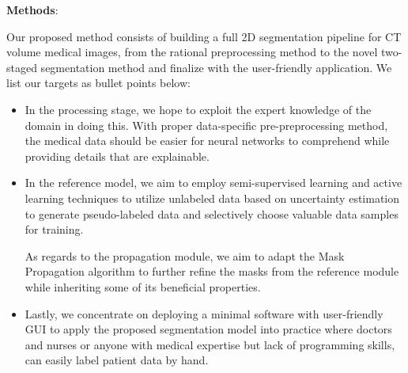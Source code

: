 \documentclass[12pt]{article}
\begin{document}
\textbf{Methods}: \par Our proposed method consists of building a full 2D segmentation pipeline for CT volume medical images, from the rational preprocessing method to the novel two-staged segmentation method and finalize with the user-friendly application.  We list our targets as bullet points below:
\vspace{-2mm}
\begin{itemize}

\item In the processing stage, we hope to exploit the expert knowledge of the domain in doing this. With proper data-specific pre-preprocessing method, the medical data should be easier for neural networks to comprehend while providing details that are explainable. 

\item In the reference model, we aim to employ semi-supervised learning and active learning techniques to utilize unlabeled data based on uncertainty estimation to generate pseudo-labeled data and selectively choose valuable data samples for training. 

\itemIn As regards to the propagation module, we aim to adapt the Mask Propagation algorithm to further refine the masks from the reference module while inheriting some of its beneficial properties.

\item Lastly, we concentrate on deploying a minimal software with user-friendly GUI to apply the proposed segmentation model into practice where doctors and nurses or anyone with medical expertise but lack of programming skills, can easily label patient data by hand.  
\end{itemize}
\end{document}
